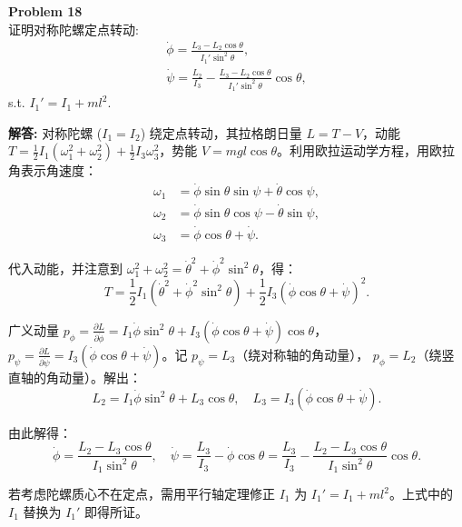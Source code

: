 \documentclass[12pt, a4paper, oneside]{ctexart}
\newenvironment{solution}{\par\noindent\textbf{解答:}\quad}{\par}
\begin{document}
\begin{mdframed}[backgroundcolor=gray!10, linewidth=0pt]
    \textbf{Problem 18} \\
    证明对称陀螺定点转动:
    \[
    \begin{gathered}
        \dot{\phi} = \frac{L_3 - L_2\cos\theta}{I_1'\sin^2\theta}, \\
        \dot{\psi} = \frac{L_2}{I_3} - \frac{L_3 - L_2\cos\theta}{I_1'\sin^2\theta}\cos\theta,
    \end{gathered}
    \]
    s.t. \(I_1' = I_1 + m l^2\).
\end{mdframed}
\begin{solution}
    对称陀螺 (\(I_1 = I_2\)) 绕定点转动，其拉格朗日量 \(L = T - V\)，动能 \(T = \frac{1}{2} I_1 (\omega_1^2 + \omega_2^2) + \frac{1}{2} I_3 \omega_3^2\)，势能 \(V = mgl \cos\theta\)。利用欧拉运动学方程，用欧拉角表示角速度：
    \[
    \begin{aligned}
        \omega_1 &= \dot{\phi} \sin\theta \sin\psi + \dot{\theta} \cos\psi, \\
        \omega_2 &= \dot{\phi} \sin\theta \cos\psi - \dot{\theta} \sin\psi, \\
        \omega_3 &= \dot{\phi} \cos\theta + \dot{\psi}.
    \end{aligned}
    \]
    
    代入动能，并注意到 \(\omega_1^2 + \omega_2^2 = \dot{\theta}^2 + \dot{\phi}^2 \sin^2\theta\)，得：
    \[
    T = \frac{1}{2} I_1 (\dot{\theta}^2 + \dot{\phi}^2 \sin^2\theta) + \frac{1}{2} I_3 (\dot{\phi} \cos\theta + \dot{\psi})^2.
    \]
    
    广义动量 \(p_\phi = \frac{\partial L}{\partial \dot{\phi}} = I_1 \dot{\phi} \sin^2\theta + I_3 (\dot{\phi} \cos\theta + \dot{\psi}) \cos\theta\)， \(p_\psi = \frac{\partial L}{\partial \dot{\psi}} = I_3 (\dot{\phi} \cos\theta + \dot{\psi})\)。记 \(p_\psi = L_3\)（绕对称轴的角动量）， \(p_\phi = L_2\)（绕竖直轴的角动量）。解出：
    \[
    L_2 = I_1 \dot{\phi} \sin^2\theta + L_3 \cos\theta, \quad L_3 = I_3 (\dot{\phi} \cos\theta + \dot{\psi}).
    \]
    
    由此解得：
    \[
    \dot{\phi} = \frac{L_2 - L_3 \cos\theta}{I_1 \sin^2\theta}, \quad \dot{\psi} = \frac{L_3}{I_3} - \dot{\phi} \cos\theta = \frac{L_3}{I_3} - \frac{L_2 - L_3 \cos\theta}{I_1 \sin^2\theta} \cos\theta.
    \]
    
    若考虑陀螺质心不在定点，需用平行轴定理修正 \(I_1\) 为 \(I_1' = I_1 + m l^2\)。上式中的 \(I_1\) 替换为 \(I_1'\) 即得所证。
\end{solution}
\end{document}
